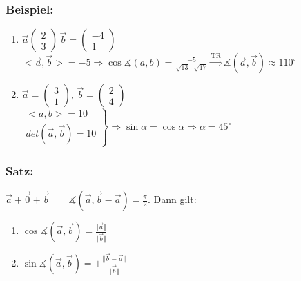 \subsubsection{Beispiel:}
\begin{enumerate}
	\item $\vec{a}\begin{pmatrix}2\\3\end{pmatrix} \, \vec{b}=
	\begin{pmatrix}-4\\1\end{pmatrix}$ \\
	$<\vec{a},\vec{b}>=-5\Rightarrow\cos\measuredangle(a,b)=\frac{-5}
	{\sqrt{13}\cdot\sqrt{17}} \mathop{\Rightarrow}\limits^{\text{TR}}\measuredangle
	(\vec{a},\vec{b})\approx110^{\circ}$
	\item $\vec{a}=\begin{pmatrix} 3 \\ 1 \end{pmatrix}, \, \vec{b}=\begin{pmatrix}2 \\ 4 
	\end{pmatrix}$\\
	$
	\left.
	\begin{array}{cc}
	<a,b>=10 \\
	det(\vec{a},\vec{b})=10
	\end{array}
	\right\} 
	\Rightarrow \sin\alpha=\cos\alpha \Rightarrow \alpha = 45^{\circ}$
\end{enumerate}
%
%
%
\subsubsection{Satz:}	
$\vec{a} + \vec{0} + \vec{b} \qquad \measuredangle(\vec{a},\vec{b}-\vec{a})=\frac{\pi}{2}$. Dann gilt:
%
%
\begin{enumerate}
	\item $\cos \measuredangle(\vec{a},\vec{b})=\frac{\Vert\vec{a}\Vert}
	{\Vert\vec{b}\Vert}$
	\item $\sin\measuredangle(\vec{a},\vec{b})=\pm\frac{\Vert\vec{b}-\vec{a}\Vert}
	{\Vert\vec{b}\Vert}$
\end{enumerate}
%
%
%
